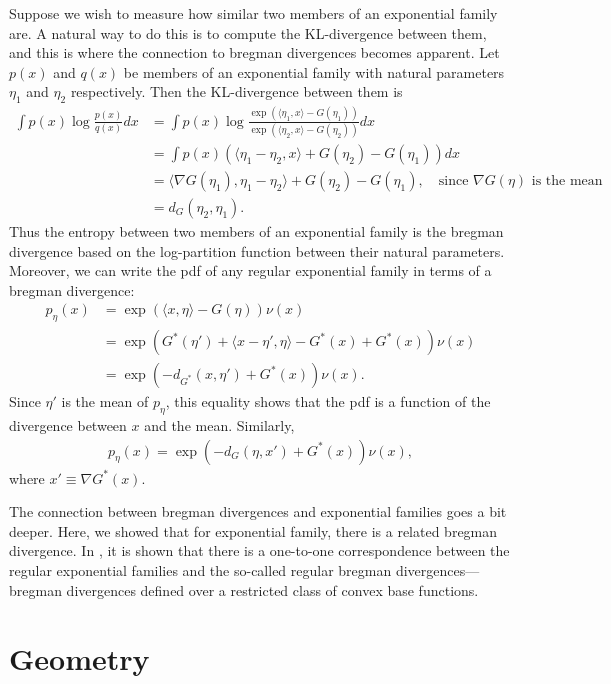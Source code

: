 \documentclass{article}
\begin{document}
Suppose we wish to measure how similar two members of an exponential
family are.  A natural way to do this is to compute the KL-divergence
between them, and this is where the connection to bregman divergences
becomes apparent.  Let $p(x)$ and $q(x)$ be members of an exponential
family with natural parameters $\eta_1$ and $\eta_2$ respectively.
Then the KL-divergence between them is
\begin{align*}
\int p(x) \log\frac{p(x)}{q(x)}dx &=\int p(x)\log\frac{\exp(\langle\eta_1,x\rangle
  -G(\eta_1))}{\exp(\langle\eta_2,x\rangle -G(\eta_2))} dx\\
&= \int p(x) (\langle \eta_1-\eta_2,x\rangle +G(\eta_2) - G(\eta_1)
)dx\\
&= \langle \nabla G(\eta_1), \eta_1-\eta_2 \rangle + G(\eta_2) -
G(\eta_1), \quad\mbox{since }\nabla G(\eta)\mbox{ is the mean} \\
&=d_G(\eta_2,\eta_1).
\end{align*}
Thus the entropy between two members of an exponential family is the
bregman divergence based on the log-partition function between their
natural parameters.  Moreover, we can write the pdf of any regular
exponential family in terms of a bregman divergence:
\begin{align*}
p_{\eta}(x) &= \exp(\langle x,\eta \rangle - G(\eta)) \nu(x)\\
&= \exp(G^*(\eta ')+ \langle x-\eta',\eta \rangle - G^*(x)+G^*(x))
\nu(x)\\
&=\exp(-d_{G^*}(x,\eta') + G^*(x) )\nu(x).
\end{align*}
Since $\eta'$ is the mean of $p_{\eta}$, this equality shows
that the pdf is a function of the divergence between $x$ and the mean.
Similarly, 
\begin{align*}
p_{\eta}(x) = \exp(-d_G(\eta,x') + G^*(x))\nu(x),
\end{align*}
where $x'\equiv \nabla G^*(x)$.  

The connection between bregman divergences and exponential families
goes a bit deeper.  Here, we showed that for exponential family, there
is a related bregman divergence.  In \cite{bm.05}, it is shown that
there is a one-to-one correspondence between the regular exponential
families and the so-called regular bregman divergences---bregman
divergences defined over a restricted class of convex base functions.  

\section{Geometry}
\end{document}
